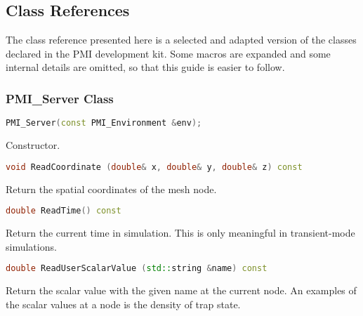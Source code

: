\documentclass[oneside,12pt]{cgd_book}
\begin{document}
\subsection{Class References}
The class reference presented here is a selected and adapted version of the classes declared in the PMI
        development kit. Some macros are expanded and some internal details are omitted, so that this guide is easier to
        follow.
\par
\subsubsection{PMI\_Server Class}
\label{sec:Extend:PMI:Ref:PMI}
\begin{lstlisting}[language={C++}]
PMI_Server(const PMI_Environment &env);
\end{lstlisting}
Constructor.
\par
\begin{lstlisting}[language={C++}]
void ReadCoordinate (double& x, double& y, double& z) const
\end{lstlisting}
Return the spatial coordinates of the mesh node.
\par
\begin{lstlisting}[language={C++}]
double ReadTime() const
\end{lstlisting}
Return the current time in simulation. This is only meaningful in transient-mode simulations.
\par
\begin{lstlisting}[language={C++}]
double ReadUserScalarValue (std::string &name) const
\end{lstlisting}
Return the scalar value with the given name at the current node. An examples of the scalar values at a
            node is the density of trap state.
\par
\end{document}
